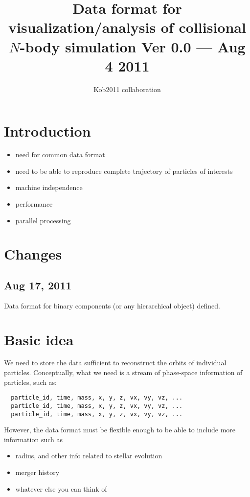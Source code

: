 \documentclass[12pt]{article}
\begin{document}
\def\bx{{\bf x}}
\def\bv{{\bf v}}
\def\ba{{\bf a}}
\def\badot{{\bf \dot{a}}}
\def\batwodot{{\bf a}^{(2)}}
\def\bathreedot{{\bf a}^{(3)}}
\def\bj{{\bf j}}
\def\dt{{\Delta t}}
\def\comment#1{}
\def\sub#1{_{\rm #1}}
\def\sup#1{^{\rm #1}}
\def\APJ{{\it Ap. J. }}
\def\APJL{{\it Ap. J. Lett. }}


\title{Data format for visualization/analysis of collisional $N$-body simulation
{\large 
Ver 0.0 --- Aug 4 2011
}
}
\author{Kob2011 collaboration}
\maketitle

\tableofcontents

\newpage

\thispagestyle{empty}




\section{Introduction}

\begin{itemize}

  \item need for common data format
  \item need to be able to reproduce complete trajectory of particles
    of interests
  \item machine independence
  \item performance
  \item parallel processing
\end{itemize}

\section{Changes}
\subsection{Aug 17, 2011}

Data format for binary components (or any hierarchical object)
defined.


\section{Basic idea}

We need to store the data sufficient to reconstruct the orbits of
individual particles. Conceptually, what we need is a stream of
phase-space information of particles, such as:
\begin{verbatim}
  particle_id, time, mass, x, y, z, vx, vy, vz, ...
  particle_id, time, mass, x, y, z, vx, vy, vz, ...
  particle_id, time, mass, x, y, z, vx, vy, vz, ...
\end{verbatim}
However, the data format must be flexible enough to be able to include
more information such as
\begin{itemize}
  \item radius, and other info related to stellar evolution
  \item merger history
  \item whatever else you can think of
\end{itemize}
\end{document}
